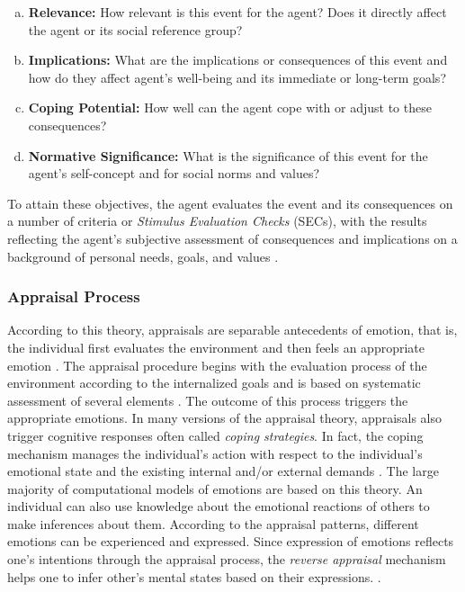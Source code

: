\documentclass[11pt]{article}
\begin{document}
\begin{enumerate}[a)]
  \item \textbf{Relevance:} How relevant is this event for the agent? Does it
  directly affect the agent or its social reference group?
  \item \textbf{Implications:} What are the implications or consequences of this
  event and how do they affect agent's well-being and its immediate or long-term
  goals?
  \item \textbf{Coping Potential:} How well can the agent cope with or adjust to
  these consequences?
  \item \textbf{Normative Significance:} What is the significance of this event
  for the agent's self-concept and for social norms and values?
\end{enumerate}

To attain these objectives, the agent evaluates the event and its consequences
on a number of criteria or \textit{Stimulus Evaluation Checks} (SECs), with the
results reflecting the agent’s subjective assessment of consequences and
implications on a background of personal needs, goals, and values
\cite{scherer:appraisal-processes}.

\subsubsection{Appraisal Process}
\label{sec:appraisal-process}

According to this theory, appraisals are separable antecedents of emotion, that
is, the individual first evaluates the environment and then feels an appropriate
emotion \cite{scherer:appraisal-processes}. The appraisal procedure begins with
the evaluation process of the environment according to the internalized goals
and is based on systematic assessment of several elements
\cite{scherer:sequential-appraisal-process}. The outcome of this process
triggers the appropriate emotions. In many versions of the appraisal theory,
appraisals also trigger cognitive responses often called \textit{coping
strategies}. In fact, the coping mechanism manages the individual's action with
respect to the individual's emotional state and the existing internal and/or
external demands \cite{folkman:coping-pitfalls-promise}. The large majority of
computational models of emotions are based on this theory. An individual can
also use knowledge about the emotional reactions of others to make inferences
about them. According to the appraisal patterns, different emotions can be
experienced and expressed. Since expression of emotions reflects one's
intentions through the appraisal process, the \textit{reverse appraisal}
mechanism helps one to infer other's mental states based on their expressions.
\cite{gratch:reverse-appraisal, hareli:emotional-reaction-perception}.
\end{document}

